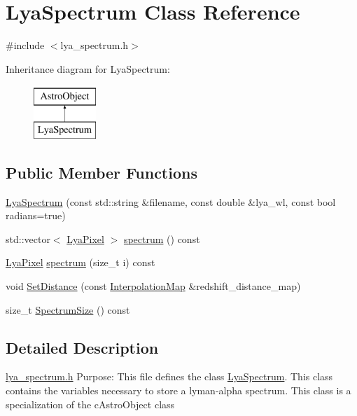 \hypertarget{class_lya_spectrum}{\section{Lya\-Spectrum Class Reference}
\label{class_lya_spectrum}
}


{\ttfamily \#include $<$lya\-\_\-spectrum.\-h$>$}

Inheritance diagram for Lya\-Spectrum\-:\begin{figure}[H]
\begin{center}
\leavevmode
\includegraphics[height=2.000000cm]{class_lya_spectrum}
\end{center}
\end{figure}
\subsection*{Public Member Functions}
\begin{DoxyCompactItemize}
\item 
\hyperlink{class_lya_spectrum_a28194690040c52a02f196ea47cad4adc}{Lya\-Spectrum} (const std\-::string \&filename, const double \&lya\-\_\-wl, const bool radians=true)
\item 
std\-::vector$<$ \hyperlink{class_lya_pixel}{Lya\-Pixel} $>$ \hyperlink{class_lya_spectrum_ab3532ecc27237cbb5231f386e1b94a62}{spectrum} () const 
\item 
\hyperlink{class_lya_pixel}{Lya\-Pixel} \hyperlink{class_lya_spectrum_a371b8e381330aded034d8c6bfb4743df}{spectrum} (size\-\_\-t i) const 
\item 
void \hyperlink{class_lya_spectrum_a5aed91d841c38e3c399e2b84b05fd2d3}{Set\-Distance} (const \hyperlink{class_interpolation_map}{Interpolation\-Map} \&redshift\-\_\-distance\-\_\-map)
\item 
size\-\_\-t \hyperlink{class_lya_spectrum_aff44677f212bf5a327d899ccbc86a5d9}{Spectrum\-Size} () const 
\end{DoxyCompactItemize}


\subsection{Detailed Description}
\hyperlink{lya__spectrum_8h}{lya\-\_\-spectrum.\-h} Purpose\-: This file defines the class \hyperlink{class_lya_spectrum}{Lya\-Spectrum}. This class contains the variables necessary to store a lyman-\/alpha spectrum. This class is a specialization of the c\-Astro\-Object class

